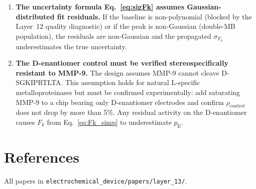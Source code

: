 \documentclass[10pt,a4paper]{article}
\numberwithin{equation}{section}
\newcommand{\Fk}{F_k}
\begin{document}
\begin{enumerate}[leftmargin=*]
\item \textbf{The uncertainty formula Eq.~\eqref{eq:sigFk} assumes
  Gaussian-distributed fit residuals.} If the baseline is non-polynomial
  (blocked by the Layer~12 quality diagnostic) or if the peak is
  non-Gaussian (double-MB population), the residuals are non-Gaussian and
  the propagated $\sigma_{\Fk}$ underestimates the true uncertainty.

\item \textbf{The D-enantiomer control must be verified stereospecifically
  resistant to MMP-9.} The design assumes MMP-9 cannot cleave
  D-SGKIPRTLTA. This assumption holds for natural L-specific metalloproteinases
  but must be confirmed experimentally: add saturating MMP-9 to a chip
  bearing only D-enantiomer electrodes and confirm $\rho_\text{control}$
  does not drop by more than 5\%. Any residual activity on the D-enantiomer
  causes $\Fk$ from Eq.~\eqref{eq:Fk_simp} to underestimate $p_\text{E}$.

\end{enumerate}

\section*{References}

\noindent All papers in \texttt{electrochemical\_device/papers/layer\_13/}.
\end{document}

